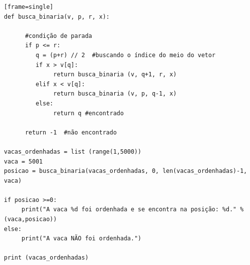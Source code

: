 \begin{verbatim}[frame=single]
def busca_binaria(v, p, r, x):
    
      #condição de parada
      if p <= r:
         q = (p+r) // 2  #buscando o índice do meio do vetor
         if x > v[q]:
              return busca_binaria (v, q+1, r, x)
         elif x < v[q]:
              return busca_binaria (v, p, q-1, x)
         else:
              return q #encontrado
      
      return -1  #não encontrado

vacas_ordenhadas = list (range(1,5000))
vaca = 5001
posicao = busca_binaria(vacas_ordenhadas, 0, len(vacas_ordenhadas)-1, vaca)

if posicao >=0:
     print("A vaca %d foi ordenhada e se encontra na posição: %d." % (vaca,posicao))
else:
     print("A vaca NÃO foi ordenhada.")

print (vacas_ordenhadas)
\end{verbatim}

